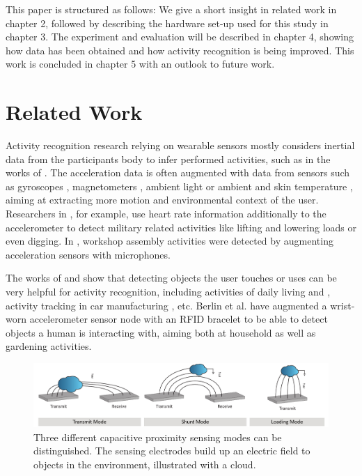 \documentclass[runningheads,a4paper]{llncs}
\begin{document}
This paper is structured as follows: We give a short insight in related work in chapter 2, followed by describing the hardware set-up used for this study in chapter 3. The experiment and evaluation will be described in chapter 4, showing how data has been obtained and how activity recognition is being improved. This work is concluded in chapter 5 with an outlook to future work.

\section{Related Work}


Activity recognition research relying on wearable sensors mostly considers inertial data from the participants body to infer performed activities, such as in the works of \cite{Ravi2005,Bao2004,Srinivasan2010,Amft2005}. The acceleration data is often augmented with data from sensors such as gyroscopes \cite{Holleczek_2010}, magnetometers \cite{Altun_2010}, ambient light \cite{Borazio2012} or ambient and skin temperature \cite{Krause_2003}, aiming at extracting more motion and environmental context of the user. Researchers in \cite{wyss2010recognition}, for example, use heart rate information additionally to the accelerometer to detect military related activities like lifting and lowering loads or even digging. In \cite{Ward_2006}, workshop assembly activities were detected by augmenting acceleration sensors with microphones.

The works of \cite{Fishkin_2005} and \cite{patterson2005fga} show that detecting objects the user touches or uses can be very helpful for activity recognition, including activities of daily living \cite{phealth:maja} and \cite{Philipose_2004}, activity tracking in car manufacturing \cite{Stiefmeier08}, etc. Berlin et al. \cite{berlin_laerhoven_tei_2010} have augmented a wrist-worn accelerometer sensor node with an RFID bracelet to be able to detect objects a human is interacting with, aiming both at household as well as gardening activities.





\begin{figure}[htbp]
	\centering
		\includegraphics[width=1.00\textwidth]{Images/modes.pdf}
	\caption{Three different capacitive proximity sensing modes can be distinguished. The sensing electrodes build up an electric field to objects in the environment, illustrated with a cloud. \cite{Smith1996}}
	\label{fig:modes}
\end{figure}
\end{document}
